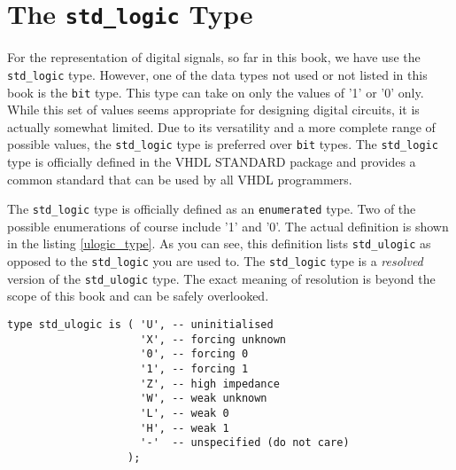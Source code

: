 \section{The \texttt{std\_logic} Type}
For the representation of digital signals, so far in this book, we have use the \texttt{std\_logic} type. However, one of the data types not used or not listed in this book is the \texttt{bit} type. This type can take on only the values of '1' or '0' only. While this set of values seems appropriate for designing digital circuits, it is actually somewhat limited. Due to its versatility and a more complete range of possible values, the \texttt{std\_logic} type is preferred over \texttt{bit} types. The \texttt{std\_logic} type is officially defined in the VHDL STANDARD package and provides a common standard that can be used by all VHDL programmers.

The \texttt{std\_logic} type is officially defined as an \texttt{enumerated} type. Two of the possible enumerations of course include '1' and '0'. The actual definition is shown in the listing \ref{ulogic_type}. As you can see, this definition lists \texttt{std\_ulogic} as opposed to the \texttt{std\_logic} you are used to. The \texttt{std\_logic} type is a \textit{resolved} version of the \texttt{std\_ulogic} type. The exact meaning of resolution is beyond the scope of this book and can be safely overlooked. 

\begin{lstlisting}[label=ulogic_type, caption=Declaration of the \texttt{std\_ulogic} enumerated type.]
type std_ulogic is ( 'U', -- uninitialised 
                     'X', -- forcing unknown
                     '0', -- forcing 0
                     '1', -- forcing 1
                     'Z', -- high impedance
                     'W', -- weak unknown
                     'L', -- weak 0
                     'H', -- weak 1
                     '-'  -- unspecified (do not care) 
                   );
\end{lstlisting}

